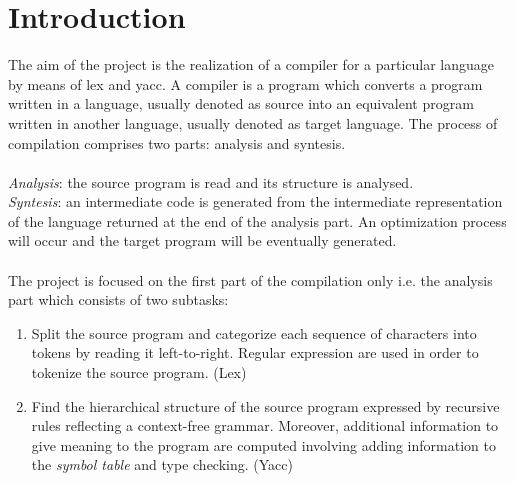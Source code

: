 \documentclass[12pt]{article}
\begin{document}
\section{Introduction}
\vspace{0.5cm}
The aim of the project is the realization of a compiler for a particular language by means of lex and yacc. A compiler is a program which converts a program written in a language, usually denoted as source into an equivalent program written in another language, usually denoted as target language. The process of compilation comprises two parts: analysis and syntesis.\\\\
\textit{Analysis}: the source program is read and its structure is analysed.\\
\textit{Syntesis}: an intermediate code is generated from the intermediate representation of the language returned at the end of the analysis part. An optimization process will occur and the target program will be eventually generated.\\\\
The project is focused on the first part of the compilation only i.e. the analysis part which consists of two subtasks:
\begin{enumerate}
\item Split the source program and categorize each sequence of characters into tokens by reading it left-to-right. Regular expression are used in order to tokenize the source program. (Lex)
\item Find the hierarchical structure of the source program expressed by recursive rules reflecting a context-free grammar. Moreover, additional information to give meaning to the program are computed involving adding information to the \textit{symbol table} and type checking. (Yacc)
\end{enumerate}
\vspace{1.7cm}




\end{document}
